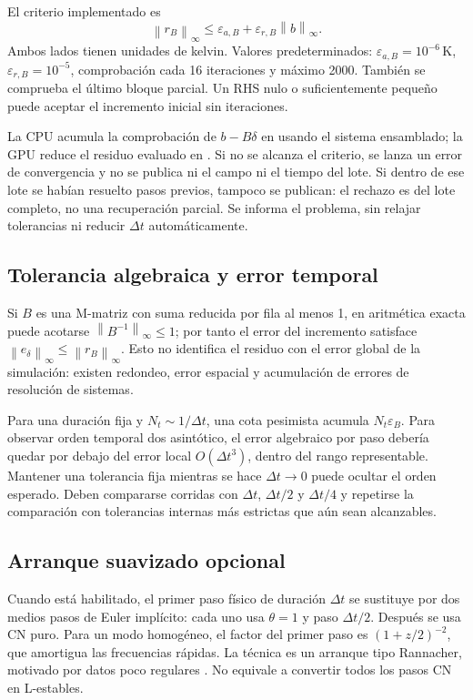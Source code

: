\documentclass[11pt,a4paper]{article}
\newcommand{\norm}[1]{\left\lVert #1\right\rVert}
\newcommand{\dt}{\Delta t}
\newcommand{\code}[1]{\texttt{\detokenize{#1}}}
\begin{document}
El criterio implementado es
\begin{equation}
 \norm{r_B}_\infty\le \varepsilon_{a,B}
           +\varepsilon_{r,B}\norm{b}_\infty.
 \label{eq:innerstop}
\end{equation}
Ambos lados tienen unidades de kelvin. Valores predeterminados:
$\varepsilon_{a,B}=10^{-6}\,\mathrm K$,
$\varepsilon_{r,B}=10^{-5}$, comprobación cada 16 iteraciones y máximo 2000.
También se comprueba el último bloque parcial. Un RHS nulo o suficientemente
pequeño puede aceptar el incremento inicial sin iteraciones.

La CPU acumula la comprobación de $b-B\delta$ en \code{Double} usando el
sistema ensamblado; la GPU reduce el residuo evaluado en \code{Float}.
Si no se alcanza el criterio, se lanza un error de convergencia y no se
publica ni el campo ni el tiempo del lote. Si dentro de ese lote se habían
resuelto pasos previos, tampoco se publican: el rechazo es del lote completo,
no una recuperación parcial. Se informa el problema, sin relajar tolerancias
ni reducir $\dt$ automáticamente.

\subsection{Tolerancia algebraica y error temporal}
Si $B$ es una M-matriz con suma reducida por fila al menos 1, en aritmética
exacta puede acotarse $\norm{B^{-1}}_\infty\le1$; por tanto el error del
incremento satisface $\norm{e_\delta}_\infty\le\norm{r_B}_\infty$.
Esto no identifica el residuo con el error global de la simulación: existen
redondeo, error espacial y acumulación de errores de resolución de sistemas.

Para una duración fija y $N_t\sim1/\dt$, una cota pesimista acumula
$N_t\varepsilon_B$. Para observar orden temporal dos asintótico, el error
algebraico por paso debería quedar por debajo del error local $O(\dt^3)$,
dentro del rango representable. Mantener una tolerancia fija mientras se hace
$\dt\to0$ puede ocultar el orden esperado. Deben compararse corridas con
$\dt$, $\dt/2$ y $\dt/4$ y repetirse la comparación con tolerancias internas
más estrictas que aún sean alcanzables.

\subsection{Arranque suavizado opcional}
Cuando está habilitado, el primer paso físico de duración $\dt$ se sustituye
por dos medios pasos de Euler implícito: cada uno usa $\theta=1$ y paso
$\dt/2$. Después se usa CN puro. Para un modo homogéneo, el factor del
primer paso es $(1+z/2)^{-2}$, que amortigua las frecuencias rápidas.
La técnica es un arranque tipo Rannacher, motivado por datos poco regulares
\cite{langtangen}. No equivale a convertir todos los pasos CN en L-estables.
\end{document}
